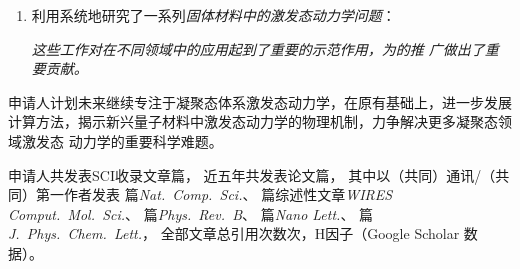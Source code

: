 \begin{enumerate}
\item 利用\hnamd{}系统地研究了一系列\emph{固体材料中的激发态动力学问题}：
  \emph{这些工作对\hnamd{}在不同领域中的应用起到了重要的示范作用，为\hnamd{}的推
    广做出了重要贡献。}
\end{enumerate}

申请人计划未来继续专注于凝聚态体系激发态动力学，在\hnamd{}原有基础上，进一步发展
计算方法，揭示新兴量子材料中激发态动力学的物理机制，力争解决更多凝聚态领域激发态
动力学的重要科学难题。


申请人共发表SCI收录文章篇，%
{
  近五年共发表论文篇，
  其中以（共同）通讯/（共同）第一作者发表
  篇{\itshape Nat.\ Comp.\ Sci.}、
  篇综述性文章{\itshape WIRES Comput.\ Mol.\ Sci.}、
  篇{\itshape Phys.\ Rev.\ B}、
  篇{\itshape Nano Lett.}、
  篇{\itshape J.\ Phys.\ Chem.\ Lett.}，
  全部文章总引用次数次，H因子（Google Scholar 数据）。
}

